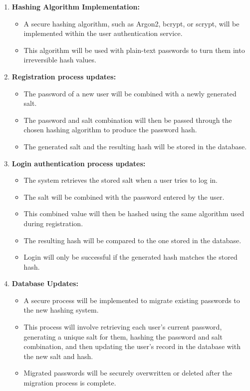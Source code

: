 \documentclass[11pt,a4paper]{article}
\begin{document}
\begin{enumerate}
    \item \textbf{Hashing Algorithm Implementation:}
    \begin{itemize}
        \item A secure hashing algorithm, such as Argon2, bcrypt, or scrypt, will be implemented within the user authentication service.
    	\item This algorithm will be used with plain-text passwords to turn them into irreversible hash values.
    \end{itemize}
    \item \textbf{Registration process updates:}
    \begin{itemize}
        \item The password of a new user will be combined with a newly generated salt.
    	\item The password and salt combination will then be passed through the chosen hashing algorithm to produce the password hash.
        \item The generated salt and the resulting hash will be stored in the database.
    \end{itemize}
    \item \textbf{Login authentication process updates:}
    \begin{itemize}
        \item The system retrieves the stored salt when a user tries to log in.
    	\item The salt will be combined with the password entered by the user.
        \item This combined value will then be hashed using the same algorithm used during registration.
        \item The resulting hash will be compared to the one stored in the database.
        \item Login will only be successful if the generated hash matches the stored hash.
    \end{itemize}
    \item \textbf{Database Updates:}
    \begin{itemize}
        \item A secure process will be implemented to migrate existing passwords to the new hashing system.
    	\item This process will involve retrieving each user's current password, generating a unique salt for them, hashing the password and salt combination, and then updating the user's record in the database with the new salt and hash.
        \item Migrated passwords will be securely overwritten or deleted after the migration process is complete.
    \end{itemize}
\end{enumerate}
\end{document}

